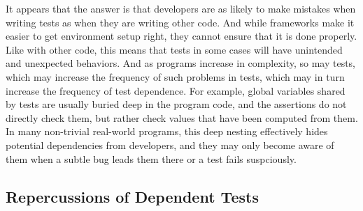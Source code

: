 It appears that the answer is that developers are as likely
to make mistakes when writing tests as when they are writing other code.
And while frameworks make it easier to get environment setup right, 
they cannot ensure that it is done properly. 
Like with other code, this means that tests in some cases will have
unintended and unexpected behaviors.  And as programs increase in complexity,
so may tests, which may increase the frequency of such problems in tests,
which may in turn increase the frequency of test dependence.
For example, global variables shared by tests
are usually buried deep in the program code, and the assertions
do not directly check them,
but rather check values that have been computed from
them. In many non-trivial real-world programs, this
deep nesting effectively hides potential dependencies from developers,
and they may only become aware of them when a subtle bug leads them
there or a test fails suspciously.



\subsection{Repercussions of Dependent Tests}



